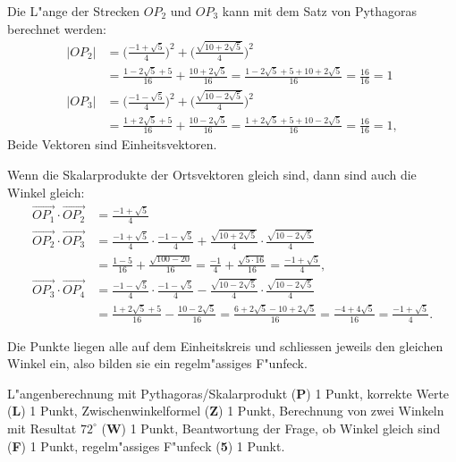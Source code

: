 \begin{loesung}
\begin{teilaufgaben}
\item Die L"ange der Strecken $OP_2$ und $OP_3$ kann mit dem Satz von
Pythagoras berechnet werden:
\begin{align*}
|OP_2|&=
\biggl(\frac{-1+\sqrt{5}}4\biggr)^2+ \biggl(\frac{\sqrt{10+2\sqrt{5}}}4 \biggr)^2
\\
&=\frac{1-2\sqrt{5}+5}{16}+\frac{10+2\sqrt{5}}{16}=\frac{1-2\sqrt{5}+5+10+2\sqrt{5}}{16}=\frac{16}{16}=1\\
|OP_3|&=
\biggl(\frac{-1-\sqrt{5}}4\biggr)^2+\biggl( \frac{\sqrt{10-2\sqrt{5}}}4 \biggr)^2
\\
&=\frac{1+2\sqrt{5}+5}{16}+\frac{10-2\sqrt{5}}{16}=\frac{1+2\sqrt{5}+5+10-2\sqrt{5}}{16}=\frac{16}{16}=1,
\end{align*}
Beide Vektoren sind Einheitsvektoren.
\item Wenn die Skalarprodukte der Ortsvektoren gleich sind, dann sind auch
die Winkel gleich:
\begin{align*}
\overrightarrow{OP_1}\cdot\overrightarrow{OP_2}
&=
\frac{-1+\sqrt{5}}4\\
\overrightarrow{OP_2}\cdot\overrightarrow{OP_3}
&=
\frac{-1+\sqrt{5}}4
\cdot
\frac{-1-\sqrt{5}}4
+
\frac{\sqrt{10+2\sqrt{5}}}4
\cdot
\frac{\sqrt{10-2\sqrt{5}}}4
\\
&=
\frac{1-5}{16}+\frac{\sqrt{100-20}}{16}
=\frac{-1}{4}+\frac{\sqrt{5\cdot 16}}{16}
=\frac{-1+\sqrt{5}}{4},
\\
\overrightarrow{OP_3}\cdot\overrightarrow{OP_4}
&=
\frac{-1-\sqrt{5}}4\cdot
\frac{-1-\sqrt{5}}4
-
 \frac{\sqrt{10-2\sqrt{5}}}4
\cdot
\frac{\sqrt{10-2\sqrt{5}}}4
\\
&=\frac{1+2\sqrt{5}+5}{16}-\frac{10-2\sqrt{5}}{16}
=\frac{6+2\sqrt{5}-10+2\sqrt{5}}{16}
=\frac{-4+4\sqrt{5}}{16}=\frac{-1+\sqrt{5}}{4}.
\end{align*}
\item
Die Punkte liegen alle auf dem Einheitskreis und schliessen jeweils
den gleichen Winkel ein, also bilden sie ein regelm"assiges F"unfeck.
\qedhere
\end{teilaufgaben}
\end{loesung}

\begin{bewertung}
L"angenberechnung mit Pythagoras/Skalarprodukt ({\bf P}) 1 Punkt,
korrekte Werte ({\bf L}) 1 Punkt,
Zwischenwinkelformel ({\bf Z}) 1 Punkt,
Berechnung von zwei Winkeln mit Resultat $72^\circ$ ({\bf W}) 1 Punkt,
Beantwortung der Frage, ob Winkel gleich sind ({\bf F}) 1 Punkt,
regelm"assiges F"unfeck ({\bf 5}) 1 Punkt.
\end{bewertung}

